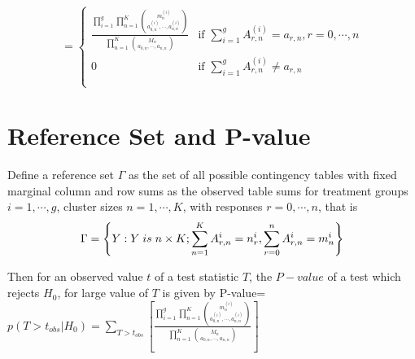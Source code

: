 \documentclass[12pt,oneside]{report}
\theoremstyle{definition}
\theoremstyle{mystyle}
\begin{document}
\[ =\begin{cases}\label{dfft}
\frac{\displaystyle \prod\limits_{i=1}^{g}\prod\limits_{n=1}^{K}\displaystyle \binom {m^{(i)}_{n}}{a^{(i)}_{0,n},\cdots,a^{(i)}_{n,n}}}{\displaystyle\prod\limits_{n=1}^{K}\displaystyle \binom {M_{n}}{a_{0,n},\cdots,a_{n,n}}}&\mbox{if }  \sum \limits_{i=1}^{g}A_{r,n}^{(i)}=a_{r,n},r=0,\cdots,n  \\
0 & \mbox{if } \sum \limits_{i=1}^{g}A_{r,n}^{(i)} \neq a_{r,n} \\ \\
\end{cases}
\]
\section{Reference Set  and P-value}
Define a reference set $\Gamma$ as the set of all possible contingency tables  with fixed marginal column  and row sums as the observed table sums for treatment groups $i=1,\cdots,g$, cluster sizes 
$n=1,\cdots,K$, with  responses $r=0,\cdots,n$, that is 
\begin{equation*}
\Gamma=\displaystyle \left \{Y:Y \hspace{1mm}{is}\hspace{1mm} n\times K ;\sum\limits_{n=1}^{K}A_{r,n}^{i}=n^{i}_{r},\sum\limits_{r=0}^{n}A_{r,n}^{i}=m^{i}_{n} \right \}
\end{equation*}




	
	Then for an observed value $t$ of a test statistic $T$, the  $P-value$ of a test which rejects $H_{0}$, for large value of $T$ is given by
	 P-value=$p(T>t_{obs}|H_{0})=\displaystyle \sum \limits_{T>t_{obs}} \left[\frac{\displaystyle \prod\limits_{i=1}^{g}\prod\limits_{n=1}^{K}\displaystyle \binom {m^{(i)}_{n}}{a^{(i)}_{0,n},\cdots,a^{(i)}_{n,n}}}{\displaystyle\prod\limits_{n=1}^{K}\displaystyle \binom {M_{n}}{a_{0,n},\cdots,a_{n,n}}} \right]$\\
	
\end{document}
